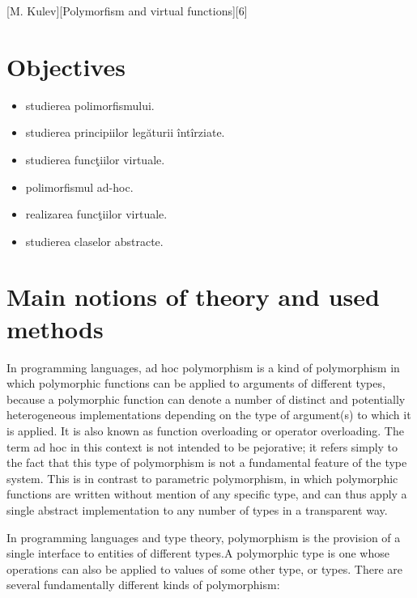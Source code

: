 \documentclass{article}
\begin{document}
	\def \reportSubj{Polymorfism and virtual functions}
	[M. Kulev][\reportSubj][6]

	\section{Objectives}
		\begin{itemize}
			\item studierea polimorfismului.
			\item studierea principiilor legăturii întîrziate.
			\item studierea funcţiilor virtuale.
			\item polimorfismul ad-hoc.
			\item realizarea funcţiilor virtuale.
			\item studierea claselor abstracte.
		\end{itemize}

	\section{Main notions of theory and used methods}
		\par In programming languages, ad hoc polymorphism is a kind of polymorphism in which polymorphic functions can be applied to arguments of different types, because a polymorphic function can denote a number of distinct and potentially heterogeneous implementations depending on the type of argument(s) to which it is applied. It is also known as function overloading or operator overloading. The term ad hoc in this context is not intended to be pejorative; it refers simply to the fact that this type of polymorphism is not a fundamental feature of the type system. This is in contrast to parametric polymorphism, in which polymorphic functions are written without mention of any specific type, and can thus apply a single abstract implementation to any number of types in a transparent way.

		\par In programming languages and type theory, polymorphism is the provision of a single interface to entities of different types.A polymorphic type is one whose operations can also be applied to values of some other type, or types. There are several fundamentally different kinds of polymorphism:
\end{document}
